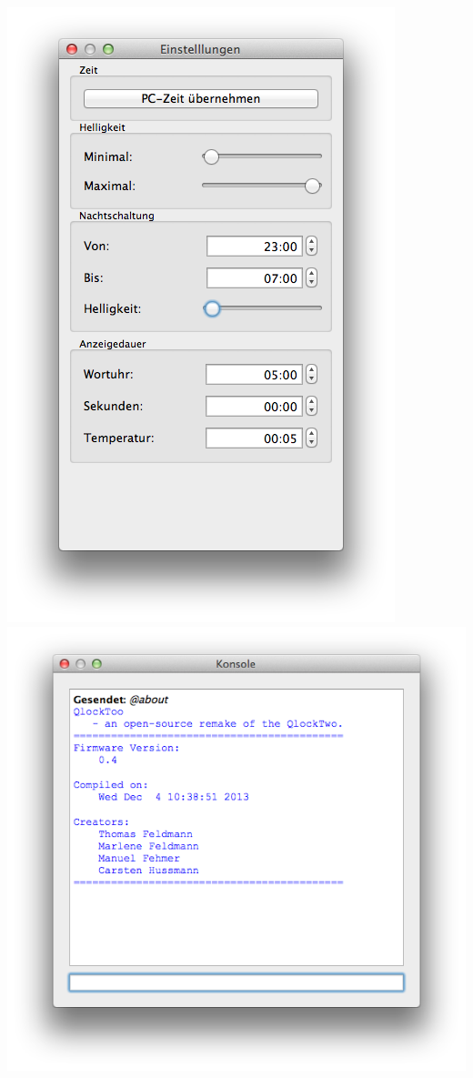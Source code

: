 \begin{multicols}{2}
\includegraphics[width=\columnwidth]{Abbildungen/Software/Einstellungen}
\includegraphics[width=\columnwidth]{Abbildungen/Software/Konsole}


\end{multicols}
